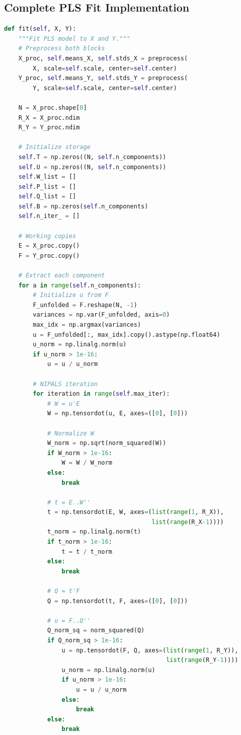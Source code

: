 \documentclass[12pt,a4paper]{article}
\begin{document}
\subsection{Complete PLS Fit Implementation}

\begin{lstlisting}[language=Python, basicstyle=\ttfamily\tiny, breaklines=true]
def fit(self, X, Y):
    """Fit PLS model to X and Y."""
    # Preprocess both blocks
    X_proc, self.means_X, self.stds_X = preprocess(
        X, scale=self.scale, center=self.center)
    Y_proc, self.means_Y, self.stds_Y = preprocess(
        Y, scale=self.scale, center=self.center)

    N = X_proc.shape[0]
    R_X = X_proc.ndim
    R_Y = Y_proc.ndim

    # Initialize storage
    self.T = np.zeros((N, self.n_components))
    self.U = np.zeros((N, self.n_components))
    self.W_list = []
    self.P_list = []
    self.Q_list = []
    self.B = np.zeros(self.n_components)
    self.n_iter_ = []

    # Working copies
    E = X_proc.copy()
    F = Y_proc.copy()

    # Extract each component
    for a in range(self.n_components):
        # Initialize u from F
        F_unfolded = F.reshape(N, -1)
        variances = np.var(F_unfolded, axis=0)
        max_idx = np.argmax(variances)
        u = F_unfolded[:, max_idx].copy().astype(np.float64)
        u_norm = np.linalg.norm(u)
        if u_norm > 1e-16:
            u = u / u_norm

        # NIPALS iteration
        for iteration in range(self.max_iter):
            # W = u'E
            W = np.tensordot(u, E, axes=([0], [0]))

            # Normalize W
            W_norm = np.sqrt(norm_squared(W))
            if W_norm > 1e-16:
                W = W / W_norm
            else:
                break

            # t = E..W''
            t = np.tensordot(E, W, axes=(list(range(1, R_X)),
                                         list(range(R_X-1))))
            t_norm = np.linalg.norm(t)
            if t_norm > 1e-16:
                t = t / t_norm
            else:
                break

            # Q = t'F
            Q = np.tensordot(t, F, axes=([0], [0]))

            # u = F..Q''
            Q_norm_sq = norm_squared(Q)
            if Q_norm_sq > 1e-16:
                u = np.tensordot(F, Q, axes=(list(range(1, R_Y)),
                                             list(range(R_Y-1))))
                u_norm = np.linalg.norm(u)
                if u_norm > 1e-16:
                    u = u / u_norm
                else:
                    break
            else:
                break


\end{lstlisting}
\end{document}
